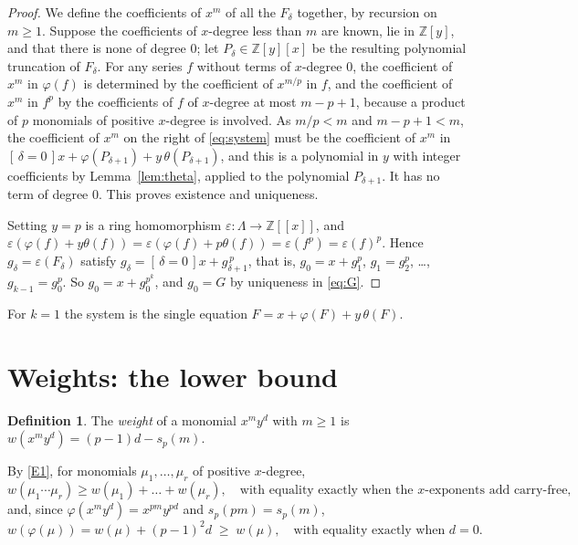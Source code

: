 \documentclass[11pt]{article}
\theoremstyle{definition}
\newtheorem{definition}[theorem]{Definition}
\theoremstyle{remark}
\newcommand{\Z}{\mathbb Z}
\newcommand{\br}[1]{[\,#1\,]}
\begin{document}
\begin{proof}
We define the coefficients of $x^m$ of all the $F_\delta$ together, by recursion on $m\ge1$.
Suppose the coefficients of $x$-degree less than $m$ are known, lie in $\Z[y]$, and that there
is none of degree $0$; let $P_\delta\in\Z[y][x]$ be the resulting polynomial truncation of
$F_\delta$. For any series $f$ without terms of $x$-degree $0$, the coefficient of $x^m$ in
$\varphi(f)$ is determined by the coefficient of $x^{m/p}$ in $f$, and the coefficient of
$x^m$ in $f^p$ by the coefficients of $f$ of $x$-degree at most $m-p+1$, because a product of
$p$ monomials of positive $x$-degree is involved. As $m/p<m$ and $m-p+1<m$, the coefficient
of $x^m$ on the right of \eqref{eq:system} must be the coefficient of $x^m$ in
$\br{\delta=0}x+\varphi(P_{\delta+1})+y\,\theta(P_{\delta+1})$, and this is a polynomial in
$y$ with integer coefficients by Lemma~\ref{lem:theta}, applied to the polynomial
$P_{\delta+1}$. It has no term of degree $0$. This proves existence and uniqueness.

Setting $y=p$ is a ring homomorphism $\varepsilon\colon\Lambda\to\Z[[x]]$, and
$\varepsilon(\varphi(f)+y\theta(f))=\varepsilon(\varphi(f)+p\theta(f))=\varepsilon(f^p)
=\varepsilon(f)^p$. Hence $g_\delta=\varepsilon(F_\delta)$ satisfy
$g_\delta=\br{\delta=0}x+g_{\delta+1}^{\,p}$, that is,
$g_0=x+g_1^p$, $g_1=g_2^p$, \dots, $g_{k-1}=g_0^p$. So $g_0=x+g_0^{p^k}$, and $g_0=G$ by
uniqueness in \eqref{eq:G}.
\end{proof}

For $k=1$ the system is the single equation $F=x+\varphi(F)+y\,\theta(F)$.

\section{Weights: the lower bound}

\begin{definition}
The \emph{weight} of a monomial $x^my^d$ with $m\ge1$ is $w(x^my^d)=(p-1)d-s_p(m)$.
\end{definition}

By \ref{E1}, for monomials $\mu_1,\dots,\mu_r$ of positive $x$-degree,
\begin{equation}\label{eq:wprod}
 w(\mu_1\cdots\mu_r)\ge w(\mu_1)+\dots+w(\mu_r),\quad\text{with equality exactly when the
 $x$-exponents add carry-free,}
\end{equation}
and, since $\varphi(x^my^d)=x^{pm}y^{pd}$ and $s_p(pm)=s_p(m)$,
\begin{equation}\label{eq:wphi}
 w(\varphi(\mu))=w(\mu)+(p-1)^2d\;\ge\;w(\mu),\quad\text{with equality exactly when }d=0.
\end{equation}
\end{document}
